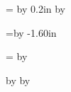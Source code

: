 \tempp = \hlabel  \advance \tempp by 0.2in
\multiply \tempp by \ncols 
\setlength{\textwidth}{\tempp}

\tempp=\vcorner \advance \tempp by -1.60in
\setlength{\topmargin}{\tempp}%

\tempp = \vlabel \multiply\tempp by \nrows 

\renewcommand{\familydefault}{\sfdefault}

\setlength{\textheight}{\tempp}
\setlength{\headheight}{-.6in}
\setlength{\footheight}{0in}
\setlength{\baselineskip}{0in}
\setlength{\fboxsep}{0in}	%
\setlength{\parskip}{0in}
\setlength{\headsep}{0in}

\advance \vlabel by \vfudge
\advance \hlabel by \hfudge

\newcommand{\lb}[1]{
\fill 0.1in
\mbox{		\rule[-\vlabel]{0in}{\vlabel} %
		\begin{minipage}[t]{\hlabel}
			\begin{flushleft}
			{\sf #1}
			\end{flushleft}
		\end{minipage}
	}
}




\raggedbottom
\raggedright



